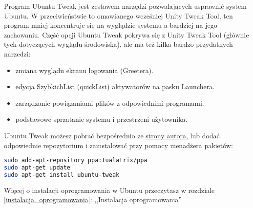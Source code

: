 Program \textcolor{ubuntu_orange}{Ubuntu Tweak} jest zestawem narzędzi pozwalających usprawnić system Ubuntu. W przeciwieństwie to omawianego wcześniej Unity Tweak Tool, ten program mniej koncentruje się na wyglądzie systemu a bardziej na jego zachowaniu. Część opcji Ubuntu Tweak pokrywa się z Unity Tweak Tool (głównie tych dotyczących wyglądu środowiska), ale ma też kilka bardzo przydatnych narzedzi:

\begin{itemize}
\item {} zmiana wyglądu ekranu logowania (Greetera).
\item {} edycja SzybkichList (quickList) aktywatorów na pasku Launchera.
\item {} zarządzanie powiązaniami plików z odpowiednimi programami.
\item {} podstawowe sprzatanie systemu i przestrzeni użytownika.
\end{itemize}

Ubuntu Tweak możesz pobrać bezpośrednio ze \href{http://ubuntu-tweak.com/}{strony autora}, lub dodać odpowiednie repozytorium i zainstalować przy pomocy menadżera pakietów:
\begin{lstlisting}[language=bash]
sudo add-apt-repository ppa:tualatrix/ppa
sudo apt-get update
sudo apt-get install ubuntu-tweak
\end{lstlisting}

Więcej o instalacji oprogramowania w Ubuntu przeczytasz w rozdziale \ref{instalacja_oprogramowania}: ,,Instalacja oprogramowania''